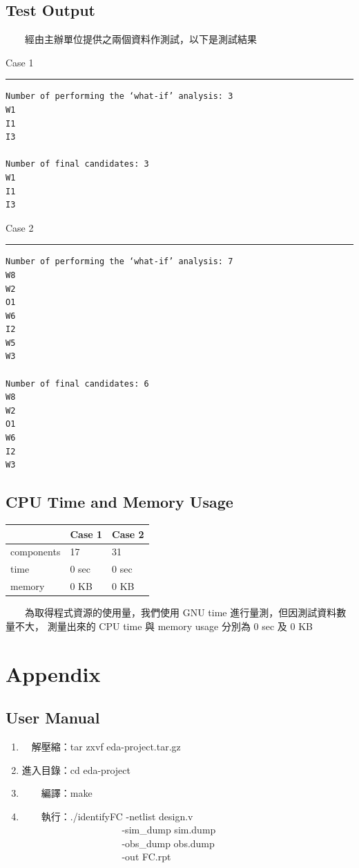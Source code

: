 \documentclass[12pt,a4paper]{article}
\begin{document}
\begin{CJK*}{UTF8}{song}
\subsection{Test Output}

　　經由主辦單位提供之兩個資料作測試，以下是測試結果

Case 1
\hrule
\begin{verbatim}
Number of performing the ‘what-if’ analysis: 3
W1
I1
I3

Number of final candidates: 3
W1
I1
I3
\end{verbatim}

Case 2
\hrule
\begin{verbatim}
Number of performing the ‘what-if’ analysis: 7
W8
W2
O1
W6
I2
W5
W3

Number of final candidates: 6
W8
W2
O1
W6
I2
W3
\end{verbatim}

\subsection{CPU Time and Memory Usage}

\begin{tabular}{|l|l|l|}
  \hline
               & Case 1 & Case 2\\
  \hline
  components   & 17     & 31\\
  \hline
  time    & 0 sec  & 0 sec\\
  \hline
  memory  & 0 KB   & 0 KB\\
  \hline
\end{tabular}

　　為取得程式資源的使用量，我們使用 GNU time 進行量測，但因測試資料數量不大，%
測量出來的 CPU time 與 memory usage 分別為 $0$ sec 及 $0$ KB

\section{Appendix}

\subsection{User Manual}

\begin{enumerate}
\item 　解壓縮：tar zxvf eda-project.tar.gz
\item 進入目錄：cd eda-project
\item 　　編譯：make
\item 　　執行：./identifyFC -netlist design.v\\
　　　　　　　　　　 -sim\_dump sim.dump\\
　　　　　　　　　　 -obs\_dump obs.dump\\
　　　　　　　　　　 -out FC.rpt
\end{enumerate}


\end{CJK*}
\end{document}
